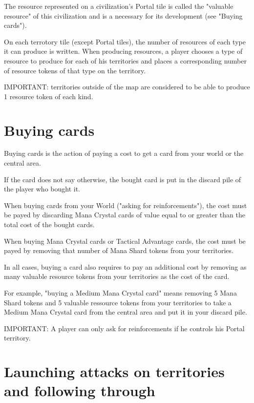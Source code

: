 \documentclass[a4paper]{article}
\begin{document}
    The resource represented on a civilization's Portal tile is called the "valuable resource" of this civilization and is a necessary for its development (see "Buying cards").

    On each terrotory tile (except Portal tiles), the number of resources of each type it can produce is written.
    When producing resources, a player chooses a type of resource to produce for each of his territories and places a corresponding number of resource tokens of that type on the territory.

    IMPORTANT: territories outside of the map are considered to be able to produce 1 resource token of each kind.



\section{Buying cards}

    Buying cards is the action of paying a cost to get a card from your world or the central area.

    If the card does not say otherwise, the bought card is put in the discard pile of the player who bought it.

    When buying cards from your World ("asking for reinforcements"),
    the cost must be payed by discarding Mana Crystal cards of value equal to or greater
    than the total cost of the bought cards.

    When buying Mana Crystal cards or Tactical Advantage cards,
    the cost must be payed by removing that number of Mana Shard tokens from your territories.

    In all cases, buying a card also requires to pay an additional cost by removing as
    many valuable resource tokens from your territories as the cost of the card.

    For example, "buying a Medium Mana Crystal card" means removing 5 Mana Shard tokens and 5 valuable ressource
    tokens from your territories to take a Medium Mana Crystal card from the central area and put it in your discard pile.

    IMPORTANT: A player can only ask for reinforcements if he controls his Portal territory. 



\section{Launching attacks on territories and following through}
\end{document}
